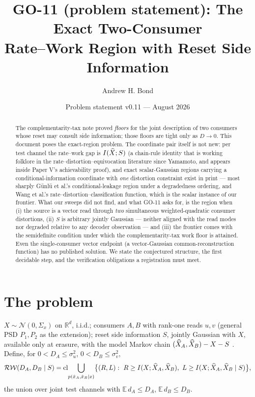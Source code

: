\documentclass[11pt]{article}
\title{GO-11 (problem statement): The Exact Two-Consumer\\
Rate--Work Region with Reset Side Information}
\author{Andrew H. Bond}
\date{Problem statement v0.11 --- August 2026}
\newcommand{\E}{\mathbb{E}}\newcommand{\tr}{\operatorname{tr}}
\begin{document}
\maketitle

\begin{abstract}
The complementarity-tax note proved \emph{floors} for the joint description
of two consumers whose reset may consult side information; those floors are
tight only as $D\to0$. This document poses the exact-region problem. The
coordinate pair itself is not new: per test channel the rate--work gap is
$I(\widehat X;S)$ (a chain-rule identity that is working folklore in the
rate--distortion--equivocation literature since Yamamoto, and appears inside
Paper V's achievability proof), and exact scalar-Gaussian regions carrying a
conditional-information coordinate with \emph{one} distortion constraint
exist in print --- most sharply G\"unl\"u et al.'s conditional-leakage
region under a degradedness ordering, and Wang et al.'s
rate--distortion--classification function, which is the scalar instance of
our frontier. What our sweeps did not find, and what GO-11 asks for, is the
region when (i) the source is a vector read through \emph{two} simultaneous
weighted-quadratic consumer distortions, (ii) $S$ is arbitrary jointly
Gaussian --- neither aligned with the read modes nor degraded relative to
any decoder observation --- and (iii) the frontier comes with the
semidefinite condition under which the complementarity-tax work floor is
attained. Even the single-consumer vector endpoint (a vector-Gaussian
common-reconstruction function) has no published solution. We state the
conjectured structure, the first decidable step, and the verification
obligations a registration must meet.
\end{abstract}

\section{The problem}
$X\sim\mathcal N(0,\Sigma_x)$ on $\mathbb R^d$, i.i.d.; consumers $A,B$ with
rank-one reads $u,v$ (general PSD $P_1,P_2$ as the extension); reset side
information $S$, jointly Gaussian with $X$, available only at erasure, with
the model Markov chain $(\widehat X_A,\widehat X_B)-X-S$ \cite{bondlandauerV}. Define, for
$0<D_A\le\sigma_u^2$, $0<D_B\le\sigma_v^2$,
\[
\mathcal{RW}(D_A,D_B\mid S)=\operatorname{cl}\!\bigcup_{p(\hat x_A,\hat x_B\mid x)}
\bigl\{(R,L):\ R\ge I(X;\widehat X_A,\widehat X_B),\ L\ge I(X;\widehat X_A,\widehat X_B\mid S)\bigr\},
\]
the union over joint test channels with $\E\,d_A\le D_A$, $\E\,d_B\le D_B$.
\end{document}
